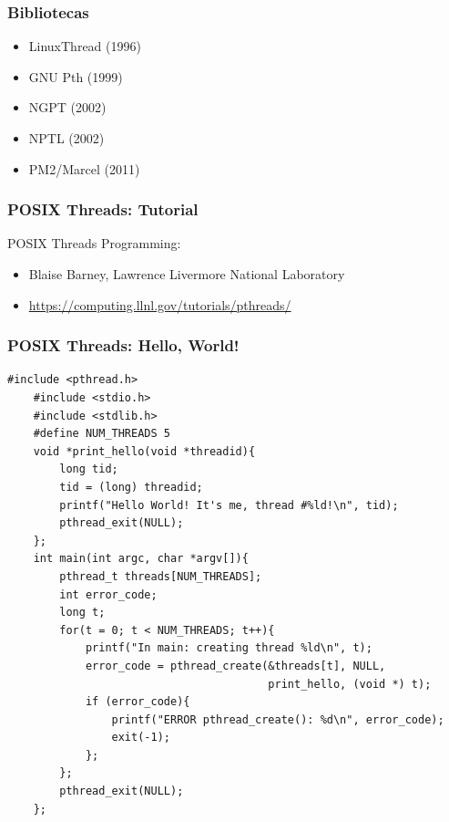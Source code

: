 \documentclass[10pt, compress]{beamer}
\begin{document}
\begin{frame}
    \frametitle{Bibliotecas}
    \begin{itemize}
        \item LinuxThread (1996)
        \item GNU Pth (1999)
        \item NGPT (2002)
        \item NPTL (2002)
        \item PM2/Marcel (2011)
    \end{itemize}
\end{frame}

\begin{frame}
    \frametitle{POSIX Threads: Tutorial}
    \alert{POSIX Threads Programming}:
    \begin{itemize}
        \item Blaise Barney, Lawrence Livermore National Laboratory	 
        \item \url{https://computing.llnl.gov/tutorials/pthreads/}
    \end{itemize}
\end{frame}

\begin{frame}[fragile]
    \frametitle{POSIX Threads: Hello, World!}
    \begin{lstlisting}[basicstyle=\ttfamily\scriptsize]
    #include <pthread.h>
    #include <stdio.h>
    #include <stdlib.h>
    #define NUM_THREADS 5
    void *print_hello(void *threadid){
        long tid;
        tid = (long) threadid;
        printf("Hello World! It's me, thread #%ld!\n", tid);
        pthread_exit(NULL);
    };
    int main(int argc, char *argv[]){
        pthread_t threads[NUM_THREADS];
        int error_code;
        long t;
        for(t = 0; t < NUM_THREADS; t++){
            printf("In main: creating thread %ld\n", t);
            error_code = pthread_create(&threads[t], NULL,
                                        print_hello, (void *) t);
            if (error_code){
                printf("ERROR pthread_create(): %d\n", error_code);
                exit(-1);
            };
        };
        pthread_exit(NULL);
    };
    \end{lstlisting}
\end{frame}

\maketitle
\end{document}
